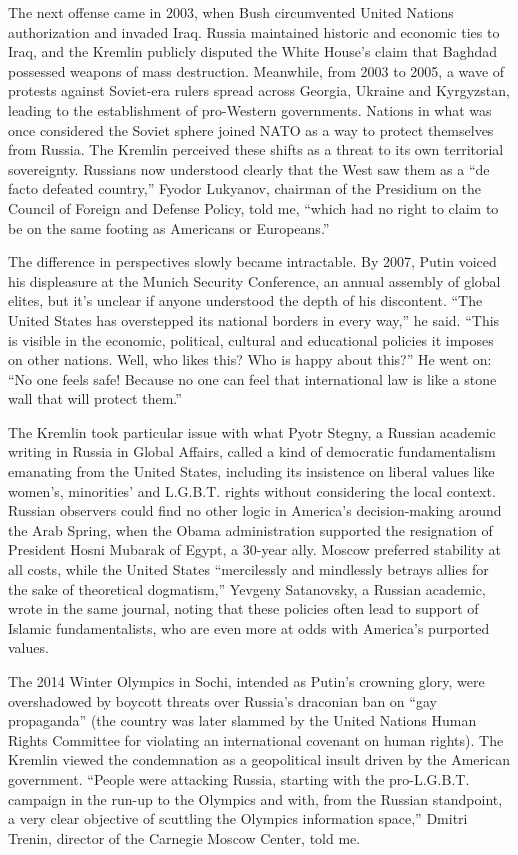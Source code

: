 The next offense came in 2003, when Bush circumvented United Nations
authorization and invaded Iraq. Russia maintained historic and economic
ties to Iraq, and the Kremlin publicly disputed the White House's claim
that Baghdad possessed weapons of mass destruction. Meanwhile, from 2003
to 2005, a wave of protests against Soviet-era rulers spread across
Georgia, Ukraine and Kyrgyzstan, leading to the establishment of
pro-Western governments. Nations in what was once considered the Soviet
sphere joined NATO as a way to protect themselves from Russia. The
Kremlin perceived these shifts as a threat to its own territorial
sovereignty. Russians now understood clearly that the West saw them as a
``de facto defeated country,'' Fyodor Lukyanov, chairman of the
Presidium on the Council of Foreign and Defense Policy, told me, ``which
had no right to claim to be on the same footing as Americans or
Europeans.''

The difference in perspectives slowly became intractable. By 2007, Putin
voiced his displeasure at the Munich Security Conference, an annual
assembly of global elites, but it's unclear if anyone understood the
depth of his discontent. ``The United States has overstepped its
national borders in every way,'' he said. ``This is visible in the
economic, political, cultural and educational policies it imposes on
other nations. Well, who likes this? Who is happy about this?'' He went
on: ``No one feels safe! Because no one can feel that international law
is like a stone wall that will protect them.''

The Kremlin took particular issue with what Pyotr Stegny, a Russian
academic writing in Russia in Global Affairs, called a kind of
democratic fundamentalism emanating from the United States, including
its insistence on liberal values like women's, minorities' and L.G.B.T.
rights without considering the local context. Russian observers could
find no other logic in America's decision-making around the Arab Spring,
when the Obama administration supported the resignation of President
Hosni Mubarak of Egypt, a 30-year ally. Moscow preferred stability at
all costs, while the United States ``mercilessly and mindlessly betrays
allies for the sake of theoretical dogmatism,'' Yevgeny Satanovsky, a
Russian academic, wrote in the same journal, noting that these policies
often lead to support of Islamic fundamentalists, who are even more at
odds with America's purported values.

The 2014 Winter Olympics in Sochi, intended as Putin's crowning glory,
were overshadowed by boycott threats over Russia's draconian ban on
``gay propaganda'' (the country was later slammed by the United Nations
Human Rights Committee for violating an international covenant on human
rights). The Kremlin viewed the condemnation as a geopolitical insult
driven by the American government. ``People were attacking Russia,
starting with the pro-L.G.B.T. campaign in the run-up to the Olympics
and with, from the Russian standpoint, a very clear objective of
scuttling the Olympics information space,'' Dmitri Trenin, director of
the Carnegie Moscow Center, told me.

